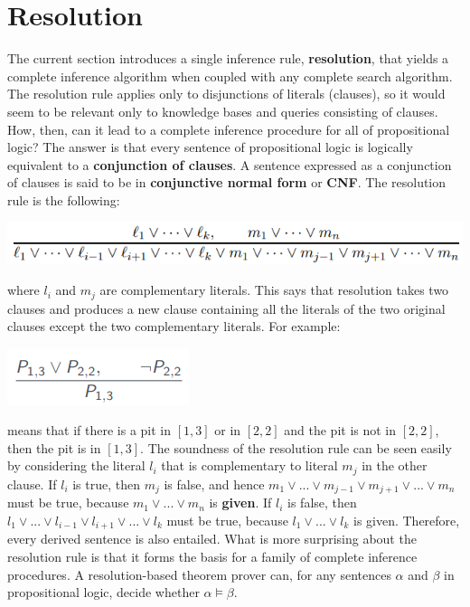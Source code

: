 \section{Resolution}
The current section introduces a single inference rule, \textbf{resolution}, that yields a complete inference algorithm when coupled with any complete search algorithm. The resolution rule applies only to disjunctions of literals (clauses), so it would seem
to be relevant only to knowledge bases and queries consisting of clauses. How, then, can it lead to a complete inference procedure for all of propositional logic?  The answer is that every sentence of propositional logic is logically equivalent to a \textbf{conjunction of clauses}. A sentence expressed as a conjunction of clauses is said to be in \textbf{conjunctive normal form} or \textbf{CNF}.\newline\newline
The resolution rule is the following:
\begin{center}
    \includegraphics[]{images/resolution.png}
\end{center}
where $l_i$ and $m_j$ are complementary literals. This says that resolution takes two clauses and produces a new clause containing all the literals of the two original clauses except the two complementary literals. For example:
\begin{center}
    \includegraphics[]{images/resolution-wumpus.png}
\end{center}
means that if there is a pit in $[1,3]$ or in $[2,2]$ and the pit is not in $[2,2]$, then the pit is in $[1,3]$.\newline\newline
The soundness of the resolution rule can be seen easily by considering the literal $l_i$ that is complementary to literal $m_j$ in the other clause. If $l_i$ is true, then $m_j$ is false, and hence $m_1 \lor ... \lor m_{j-1} \lor m_{j+1} \lor ... \lor m_n$ must be true, because $m_1 \lor ... \lor m_n$ is \textbf{given}. If $l_i$ is false, then $l_1 \lor ... \lor l_{i-1} \lor l_{i+1} \lor ... \lor l_k$ must be true, because $l_1 \lor ... \lor l_k$ is given. Therefore, every derived sentence is also entailed.\newline\newline
What is more surprising about the resolution rule is that it forms the basis for a family
of complete inference procedures. A resolution-based theorem prover can, for any sentences
$\alpha$ and $\beta$ in propositional logic, decide whether $\alpha \vDash \beta$.

